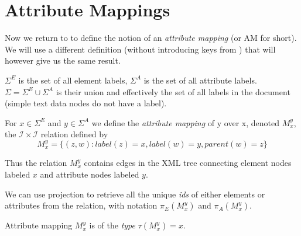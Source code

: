 




\section{Attribute Mappings}
\label{section-definitions-ams}

Now we return to \cite{fidax} to define the notion of an \textit{attribute mapping} (or AM for short). 
We will use a different definition (without introducing keys from \cite{keX}) that will however give us the same result.

\begin{define}
	$\Sigma^E$ is the set of all element labels, $\Sigma^A$ is the set of all attribute labels. $\Sigma = \Sigma^E \cup \Sigma^A$ is their union and effectively the set of all labels in the document (simple text data nodes do not have a label).
\end{define}

\begin{define}
	For $x \in \Sigma^E$ and $y \in \Sigma^A$ we define the \textit{attribute mapping} of y over x, denoted $M_{x}^{y}$, the $\mathcal{I} \times \mathcal{I}$ relation defined by
	\[M_{x}^{y} = \{ (z,w): label(z) = x, label(w) = y, parent(w) = z \}\]
\end{define}

Thus the relation $M_{x}^{y}$ contains edges in the XML tree connecting element nodes labeled $x$ and attribute nodes labeled $y$.

We can use projection to retrieve all the unique \textit{ids} of either elements or attributes from the relation, with notation $\pi_E(M_{x}^{y})$ and $\pi_A(M_{x}^{y})$.

\begin{define}
	Attribute mapping $M_{x}^{y}$ is of the \textit{type} $\tau(M_{x}^{y}) = x$.
\end{define}

